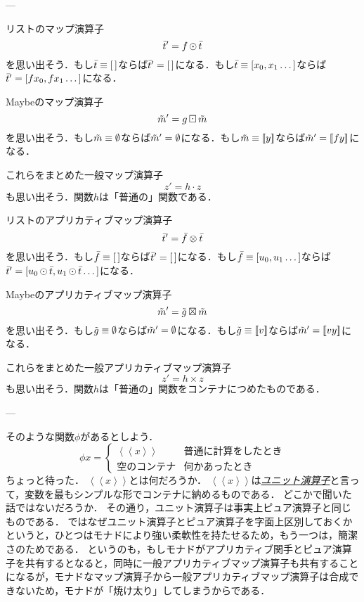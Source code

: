 \documentclass[a5paper,draft]{jsbook}
\def\[{\left[\!\left[}
\def\]{\right]\!\right]}
\newcommand{\keyword}[1]{{\underline{\emph{#1}}}}
\newcommand{\mathMaybeWith}[1]{\[#1\]}
\newcommand{\mathPureWith}[1]{\left\langle#1\right\rangle}
\newcommand{\mathUnitWith}[1]{\left\langle\!\left\langle#1\right\rangle\!\right\rangle}
\newcommand{\mathListVar}[1]{\Bar{#1}}
\newcommand{\mathMaybeVar}[1]{\Tilde{#1}}
\newcommand{\mathEmptyList}{{[\,]}}%
\newcommand{\mathNothing}{\emptyset}%
\newcommand{\mathBinaryOperator}[1]{\operatorname{#1}}
\newcommand{\mathApplicativeGeneralMap}{\times}
\newcommand{\mathApplicativeMap}{\otimes}
\newcommand{\mathApplicativeMaybeMap}{\boxtimes}
\newcommand{\mathGeneralMap}{\mathBinaryOperator{\cdot}}
\newcommand{\mathMap}{\mathBinaryOperator{\odot}}
\newcommand{\mathMaybeMap}{\mathBinaryOperator{\boxdot}}
\begin{document}
---

リストのマップ演算子$$\mathListVar{t}'=f\mathMap\mathListVar{t}$$を思い出そう．もし$\mathListVar{t}\equiv\mathEmptyList$ならば$\mathListVar{t}'=\mathEmptyList$になる．もし$\mathListVar{t}\equiv[x_0,x_1\dots]$ならば$\mathListVar{t}'=[fx_0,fx_1\dots]$になる．

Maybeのマップ演算子$$\mathMaybeVar{m}'=g\mathMaybeMap\mathMaybeVar{m}$$を思い出そう．もし$\mathMaybeVar{m}\equiv\mathNothing$ならば$\mathMaybeVar{m}'=\mathNothing$になる．もし$\mathMaybeVar{m}\equiv\mathMaybeWith{y}$ならば$\mathMaybeVar{m}'=\mathMaybeWith{fy}$になる．

これらをまとめた一般マップ演算子$$z'=h\mathGeneralMap z$$も思い出そう．関数$h$は「普通の」関数である．

リストのアプリカティブマップ演算子$$\mathListVar{t}'=\mathListVar{f}\mathApplicativeMap\mathListVar{t}$$を思い出そう．もし$\mathListVar{f}\equiv\mathEmptyList$ならば$\mathListVar{t}'=\mathEmptyList$になる．もし$\mathListVar{f}\equiv[u_0,u_1\dots]$ならば$\mathListVar{t}'=[u_0\mathMap\mathListVar{t},u_1\mathMap\mathListVar{t}\dots]$になる．

Maybeのアプリカティブマップ演算子$$\mathMaybeVar{m}'=\mathMaybeVar{g}\mathApplicativeMaybeMap\mathMaybeVar{m}$$を思い出そう．もし$\mathMaybeVar{g}\equiv\mathNothing$ならば$\mathMaybeVar{m}'=\mathNothing$になる．もし$\mathMaybeVar{g}\equiv\mathMaybeWith{v}$ならば$\mathMaybeVar{m}'=\mathMaybeWith{vy}$になる．

これらをまとめた一般アプリカティブマップ演算子$$z'=h\mathApplicativeGeneralMap z$$も思い出そう．関数$h$は「普通の」関数をコンテナにつめたものである．


---

そのような関数$\phi$があるとしよう．
$$\phi x=\begin{cases}\mathUnitWith{x}&\text{普通に計算をしたとき}\\
\text{空のコンテナ}&\text{何かあったとき}\end{cases}$$
ちょっと待った．
$\mathUnitWith{x}$とは何だろうか．
$\mathUnitWith{x}$は\keyword{ユニット演算子}と言って，変数を最もシンプルな形でコンテナに納めるものである．
どこかで聞いた話ではないだろうか．
その通り，ユニット演算子は事実上ピュア演算子と同じものである．
ではなぜユニット演算子とピュア演算子を字面上区別しておくかというと，ひとつはモナドにより強い柔軟性を持たせるため，もう一つは，簡潔さのためである．
というのも，もしモナドがアプリカティブ関手とピュア演算子を共有するとなると，同時に一般アプリカティブマップ演算子も共有することになるが，モナドなマップ演算子から一般アプリカティブマップ演算子は合成できないため，モナドが「焼け太り」してしまうからである．
\end{document}
